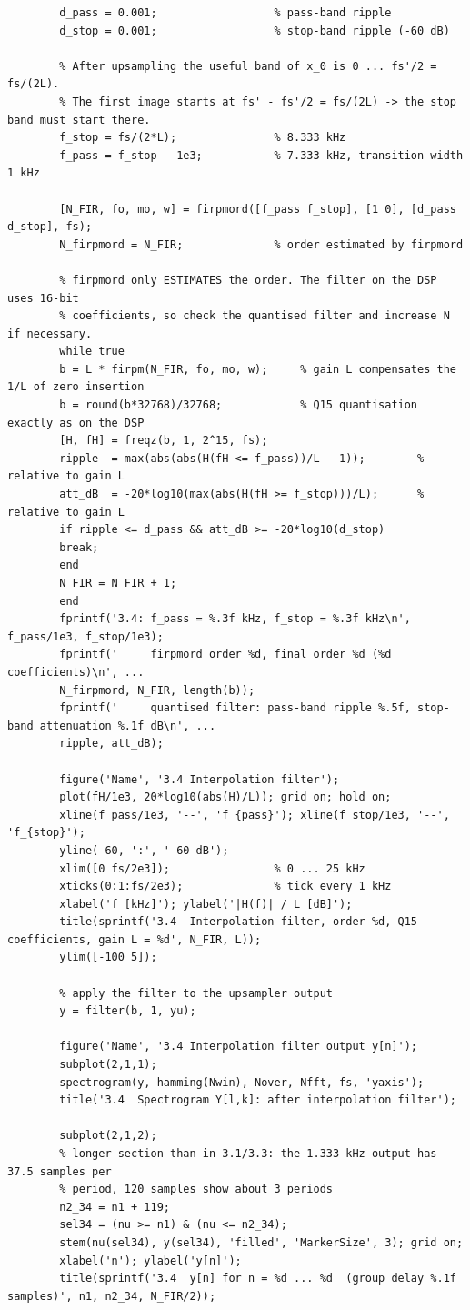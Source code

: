 \documentclass[a4paper,11pt]{article}
\begin{document}
	\begin{lstlisting}[style=matlab, caption={MATLAB code, Section 3.4}, label={lst:m34}]
		%% 3.4 Interpolation (anti-imaging) filter
		d_pass = 0.001;                  % pass-band ripple
		d_stop = 0.001;                  % stop-band ripple (-60 dB)
		
		% After upsampling the useful band of x_0 is 0 ... fs'/2 = fs/(2L).
		% The first image starts at fs' - fs'/2 = fs/(2L) -> the stop band must start there.
		f_stop = fs/(2*L);               % 8.333 kHz
		f_pass = f_stop - 1e3;           % 7.333 kHz, transition width 1 kHz
		
		[N_FIR, fo, mo, w] = firpmord([f_pass f_stop], [1 0], [d_pass d_stop], fs);
		N_firpmord = N_FIR;              % order estimated by firpmord
		
		% firpmord only ESTIMATES the order. The filter on the DSP uses 16-bit
		% coefficients, so check the quantised filter and increase N if necessary.
		while true
		b = L * firpm(N_FIR, fo, mo, w);     % gain L compensates the 1/L of zero insertion
		b = round(b*32768)/32768;            % Q15 quantisation exactly as on the DSP
		[H, fH] = freqz(b, 1, 2^15, fs);
		ripple  = max(abs(abs(H(fH <= f_pass))/L - 1));        % relative to gain L
		att_dB  = -20*log10(max(abs(H(fH >= f_stop)))/L);      % relative to gain L
		if ripple <= d_pass && att_dB >= -20*log10(d_stop)
		break;
		end
		N_FIR = N_FIR + 1;
		end
		fprintf('3.4: f_pass = %.3f kHz, f_stop = %.3f kHz\n', f_pass/1e3, f_stop/1e3);
		fprintf('     firpmord order %d, final order %d (%d coefficients)\n', ...
		N_firpmord, N_FIR, length(b));
		fprintf('     quantised filter: pass-band ripple %.5f, stop-band attenuation %.1f dB\n', ...
		ripple, att_dB);
		
		figure('Name', '3.4 Interpolation filter');
		plot(fH/1e3, 20*log10(abs(H)/L)); grid on; hold on;
		xline(f_pass/1e3, '--', 'f_{pass}'); xline(f_stop/1e3, '--', 'f_{stop}');
		yline(-60, ':', '-60 dB');
		xlim([0 fs/2e3]);                % 0 ... 25 kHz
		xticks(0:1:fs/2e3);              % tick every 1 kHz
		xlabel('f [kHz]'); ylabel('|H(f)| / L [dB]');
		title(sprintf('3.4  Interpolation filter, order %d, Q15 coefficients, gain L = %d', N_FIR, L));
		ylim([-100 5]);
		
		% apply the filter to the upsampler output
		y = filter(b, 1, yu);
		
		figure('Name', '3.4 Interpolation filter output y[n]');
		subplot(2,1,1);
		spectrogram(y, hamming(Nwin), Nover, Nfft, fs, 'yaxis');
		title('3.4  Spectrogram Y[l,k]: after interpolation filter');
		
		subplot(2,1,2);
		% longer section than in 3.1/3.3: the 1.333 kHz output has 37.5 samples per
		% period, 120 samples show about 3 periods
		n2_34 = n1 + 119;
		sel34 = (nu >= n1) & (nu <= n2_34);
		stem(nu(sel34), y(sel34), 'filled', 'MarkerSize', 3); grid on;
		xlabel('n'); ylabel('y[n]');
		title(sprintf('3.4  y[n] for n = %d ... %d  (group delay %.1f samples)', n1, n2_34, N_FIR/2));
	\end{lstlisting}
	
\end{document}
